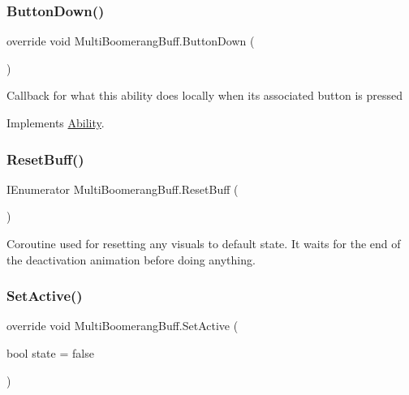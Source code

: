 \subsubsection{\texorpdfstring{Button\+Down()}{ButtonDown()}}
{\footnotesize\ttfamily override void Multi\+Boomerang\+Buff.\+Button\+Down (\begin{DoxyParamCaption}{ }\end{DoxyParamCaption})\hspace{0.3cm}{\ttfamily [virtual]}}



Callback for what this ability does locally when its associated button is pressed 



Implements \hyperlink{class_ability_a7722265862f8b29828315725415ce266}{Ability}.

\hypertarget{class_multi_boomerang_buff_aee200dc6740f74b977090e63cd0c44da}{}\label{class_multi_boomerang_buff_aee200dc6740f74b977090e63cd0c44da} 
\subsubsection{\texorpdfstring{Reset\+Buff()}{ResetBuff()}}
{\footnotesize\ttfamily I\+Enumerator Multi\+Boomerang\+Buff.\+Reset\+Buff (\begin{DoxyParamCaption}{ }\end{DoxyParamCaption})}



Coroutine used for resetting any visuals to default state. It waits for the end of the deactivation animation before doing anything. 

\hypertarget{class_multi_boomerang_buff_a40111507e750be94b8f48acd57878d60}{}\label{class_multi_boomerang_buff_a40111507e750be94b8f48acd57878d60} 
\subsubsection{\texorpdfstring{Set\+Active()}{SetActive()}}
{\footnotesize\ttfamily override void Multi\+Boomerang\+Buff.\+Set\+Active (\begin{DoxyParamCaption}\item[{bool}]{state = {\ttfamily false} }\end{DoxyParamCaption})\hspace{0.3cm}{\ttfamily [virtual]}}




